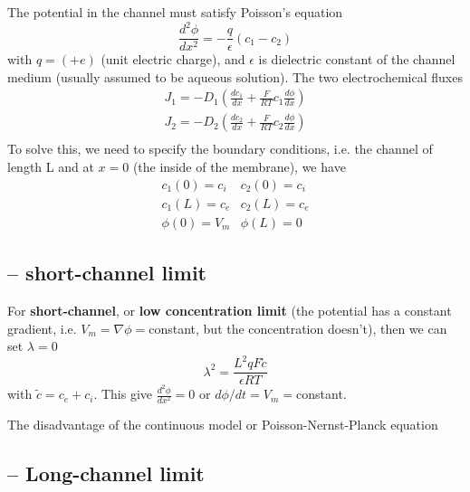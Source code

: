 The potential in the channel must satisfy Poisson's equation
\begin{equation}
  \label{eq:303}
  \frac{d^2\phi}{dx^2} = -\frac{q}{\epsilon}(c_1-c_2)
\end{equation}
with $q=(+e)$ (unit electric charge), and $\epsilon$ is dielectric
constant of the channel medium (usually assumed to be aqueous
solution). The two electrochemical fluxes
\begin{equation}
  \label{eq:1393}
  \begin{split}
    J_1=-D_1(\frac{dc_1}{dx}+\frac{F}{RT}c_1\frac{d\phi}{dx})\\
    J_2=-D_2(\frac{dc_2}{dx}+\frac{F}{RT}c_2\frac{d\phi}{dx})\\
  \end{split}
\end{equation}
To solve this, we need to specify the boundary conditions, i.e. the
channel of length L and at $x=0$ (the inside of the membrane), we have
\begin{equation}
  \label{eq:1394}
  \begin{array}{cc}
    c_1(0)=c_i & c_2(0) = c_i \\
    c_1(L)=c_e & c_2(L) = c_e \\
    \phi(0) = V_m & \phi(L) = 0
  \end{array}
\end{equation}

\subsection{-- short-channel limit}
\label{sec:short-channel-limit}


For {\bf short-channel}, or {\bf low concentration limit} (the
potential has a constant gradient, i.e. $V_m=\nabla \phi=$constant,
but the concentration doesn't), then we can set $\lambda=0$
\begin{equation}
  \label{eq:1397}
  \lambda^2 = \frac{L^2qF\tilde{c}}{\epsilon RT}
\end{equation}
with $\tilde{c}=c_e+c_i$. This give $\frac{d^2\phi}{dx^2}=0$ or $d\phi/dt=V_m=$constant.

The disadvantage of the continuous model or Poisson-Nernst-Planck
equation

\subsection{-- Long-channel limit}
\label{sec:long-channel-limit}

